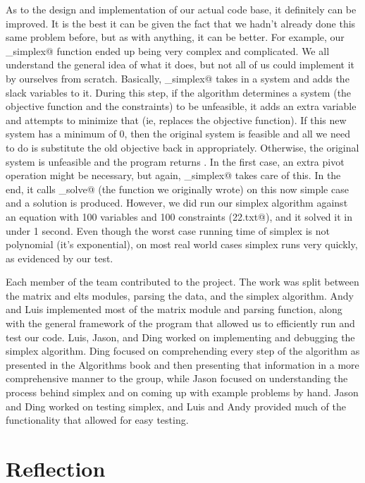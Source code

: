 \documentclass[letterpaper,12pt]{article}
\begin{document}
As to the design and implementation of our actual code base, it definitely can
be improved. It is the best it can be given the fact that we hadn't already done
this same problem before, but as with anything, it can be better. For example,
our \verb@initialize_simplex@ function ended up being very complex and
complicated. We all understand the general idea of what it does, but not all of
us could implement it by ourselves from scratch. Basically,
\verb@initialize_simplex@ takes in a system and adds the slack variables to it.  
During this step, if the algorithm determines a system (the objective
function and the constraints) to be unfeasible, it adds an extra variable and
attempts to minimize that (ie, replaces the objective function). If this new
system has a minimum of 0, then the original system is feasible and all we need
to do is substitute the old objective back in appropriately. Otherwise, the
original system is unfeasible and the program returns \verb@None@. In the first
case, an extra pivot operation might be necessary, but again,
\verb@initialize_simplex@ takes care of this. In the end, it calls
\verb@simple_solve@ (the function we originally wrote) on this now simple case
and a solution is produced. However, we did run our simplex algorithm against an
equation with 100 variables and 100 constraints (\verb@test22.txt@), and it
solved it in under 1 second. Even though the worst case running time of simplex
is not polynomial (it's exponential), on most real world cases simplex runs very
quickly, as evidenced by our test. 

Each member of the team contributed to the project. The work was split between
the matrix and elts modules, parsing the data, and the simplex algorithm. Andy
and Luis implemented most of the matrix module and parsing function, along with
the general framework of the program that allowed us to efficiently run and test
our code. Luis, Jason, and Ding worked on implementing and debugging the simplex
algorithm. Ding focused on comprehending every step of the algorithm as
presented in the Algorithms book and then presenting that information in a more
comprehensive manner to the group, while Jason focused on understanding the
process behind simplex and on coming up with example problems by hand. Jason and
Ding worked on testing simplex, and Luis and Andy provided much of the
functionality that allowed for easy testing. 

\section{Reflection}
\end{document}
